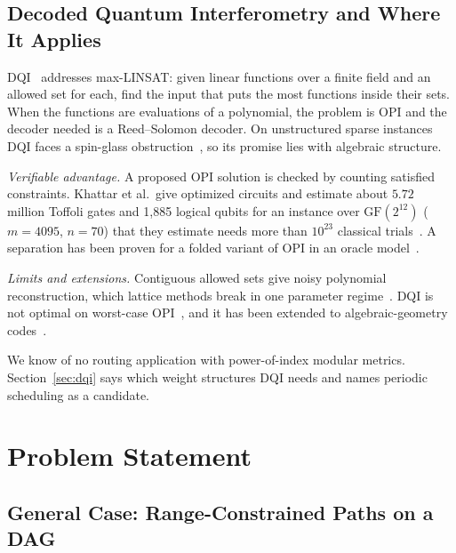 \documentclass[journal]{IEEEtran}
\begin{document}
\subsection{Decoded Quantum Interferometry and Where It Applies}

DQI~\cite{jordan2025} addresses max-LINSAT: given linear functions over a finite field and an allowed set for each, find the input that puts the most functions inside their sets. When the functions are evaluations of a polynomial, the problem is OPI and the decoder needed is a Reed--Solomon decoder. On unstructured sparse instances DQI faces a spin-glass obstruction~\cite{anschuetz2025}, so its promise lies with algebraic structure.

\emph{Verifiable advantage.} A proposed OPI solution is checked by counting satisfied constraints. Khattar et al.\ give optimized circuits and estimate about $5.72$ million Toffoli gates and 1{,}885 logical qubits for an instance over $\mathrm{GF}(2^{12})$ ($m=4095$, $n=70$) that they estimate needs more than $10^{23}$ classical trials~\cite{khattar2025}. A separation has been proven for a folded variant of OPI in an oracle model~\cite{kramer2026}.

\emph{Limits and extensions.} Contiguous allowed sets give noisy polynomial reconstruction, which lattice methods break in one parameter regime~\cite{bleichenbacher2000}. DQI is not optimal on worst-case OPI~\cite{sun2026,horinaga2026}, and it has been extended to algebraic-geometry codes~\cite{gu2025}.

We know of no routing application with power-of-index modular metrics. Section~\ref{sec:dqi} says which weight structures DQI needs and names periodic scheduling as a candidate.

\section{Problem Statement}

\subsection{General Case: Range-Constrained Paths on a DAG}
\end{document}
